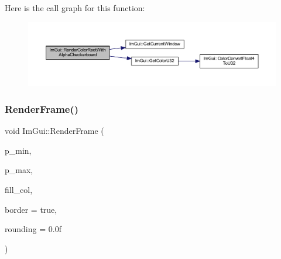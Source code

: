 Here is the call graph for this function\+:
\nopagebreak
\begin{figure}[H]
\begin{center}
\leavevmode
\includegraphics[width=350pt]{namespace_im_gui_a4715686ee0c613e8518c0f5e92c358ce_cgraph}
\end{center}
\end{figure}
\mbox{\label{namespace_im_gui_a621ba649568ede3939d4f10d83b86d04}} 
\subsubsection{\texorpdfstring{Render\+Frame()}{RenderFrame()}}
{\footnotesize\ttfamily void Im\+Gui\+::\+Render\+Frame (\begin{DoxyParamCaption}\item[{\mbox{\hyperlink{struct_im_vec2}{Im\+Vec2}}}]{p\+\_\+min,  }\item[{\mbox{\hyperlink{struct_im_vec2}{Im\+Vec2}}}]{p\+\_\+max,  }\item[{\mbox{\hyperlink{imgui_8h_a118cff4eeb8d00e7d07ce3d6460eed36}{Im\+U32}}}]{fill\+\_\+col,  }\item[{bool}]{border = {\ttfamily true},  }\item[{float}]{rounding = {\ttfamily 0.0f} }\end{DoxyParamCaption})}

